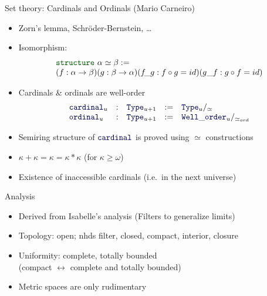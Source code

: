 \documentclass{beamer}
\newcommand{\kw}[1]{{\color{green!33!black}\ensuremath{\mathtt{#1}}}}
\newcommand{\ident}[1]{{\color{blue!33!black}\ensuremath{\mathtt{#1}}}}
\begin{document}
\begin{frame}{Set theory: Cardinals and Ordinals (Mario Carneiro)}
  \begin{itemize}[<+->]
    \item Zorn's lemma, Schröder-Bernstein, \ldots

    \item Isomorphism: \vspace{-1em} \[ \begin{array}{l} %
      \kw{structure}~\alpha \simeq \beta := \\
      (f : \alpha \to \beta) (g : \beta \to \alpha) (f\!\_g : f \circ g = id) (g\_f : g \circ f = id)
    \end{array} \]

    \item Cardinals \& ordinals are well-order
          \[
            \begin{array}{lclcl}
              \ident{cardinal}_u & : & \ident{Type}_{u+1} & := &
              \ident{Type}_u /_{\simeq}              \\
              \ident{ordinal}_u  & : & \ident{Type}_{u+1} & := &
              \ident{Well\_order}_u /_{\simeq_{ord}}
            \end{array}
          \]

    \item Semiring structure of $\ident{cardinal}$ is proved using $\simeq$ constructions

    \item $\kappa + \kappa = \kappa = \kappa * \kappa$ (for $\kappa \ge \omega$)

    \item Existence of inaccessible cardinals (i.e.~in the next universe)
  \end{itemize}
\end{frame}

\begin{frame}{Analysis}
  \begin{itemize}[<+->]
    \item Derived from Isabelle's analysis (Filters to generalize limits)
    \item Topology: open; nhds filter, closed, compact, interior, closure
    \item Uniformity: complete, totally bounded \\
      (compact $\leftrightarrow$ complete and totally bounded)
    \item Metric spaces are only rudimentary
  \end{itemize}
\end{frame}
\end{document}
